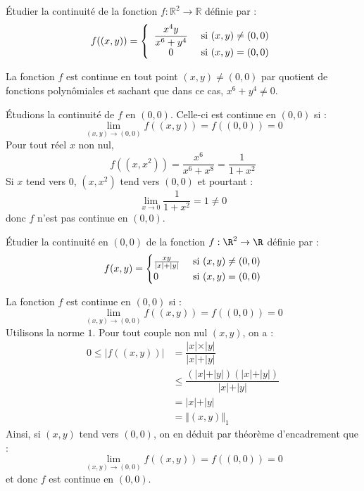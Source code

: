 \documentclass[a4paper,10pt]{report}
\begin{document}
\begin{Exercice}{} Étudier la continuité de la fonction $f : \mathbb{R}^2 \rightarrow \mathbb{R}$ définie par :
$$ f((x,y)) = \left\lbrace \begin{array}{cl}
\dfrac{x^4 y}{x^6+y^4} & \hbox{ si } (x,y) \neq (0,0) \\
0 & \hbox{ si } (x,y)=(0,0) \\
\end{array}\right.$$
\end{Exercice}

\corr La fonction $f$ est continue en tout point $(x,y) \neq (0,0)$ par quotient de fonctions polynômiales et sachant que dans ce cas, $x^6+y^4 \neq 0$. 

\medskip

\noindent Étudions la continuité de $f$ en $(0,0)$. Celle-ci est continue en $(0,0)$ si :
$$ \lim_{(x,y) \rightarrow (0,0)} f((x,y)) =f((0,0))= 0$$
Pour tout réel $x$ non nul,
$$ f((x,x^2)) = \dfrac{x^6}{x^6+x^8} = \dfrac{1}{1+x^2}$$
Si $x$ tend vers $0$, $(x,x^2)$ tend vers $(0,0)$ et pourtant :
$$ \lim_{x \rightarrow 0} \dfrac{1}{1+x^2} = 1 \neq 0$$
donc $f$ n'est pas continue en $(0,0)$.

\begin{Exercice}{} Étudier la continuité en $(0,0)$ de la fonction $f : \R^{2} \rightarrow \R$ définie par :
  \[
  f(x,y) =
  \begin{cases}
    \frac{xy}{\vert x \vert + \vert y \vert} & \hbox{ si } (x,y) \neq (0,0) \\
    0 & \hbox{ si } (x,y)=(0,0)
  \end{cases}
  \]
\end{Exercice}

\corr La fonction $f$ est continue en $(0,0)$ si :
$$ \lim_{(x,y) \rightarrow (0,0)} f((x,y)) =f((0,0))= 0$$
Utilisons la norme $1$. Pour tout couple non nul $(x,y)$, on a :
\begin{align*}
0 \leq \vert f((x,y)) \vert & = \dfrac{\vert x \vert \times \vert y \vert}{\vert x \vert + \vert y \vert} \\
& \leq \dfrac{(\vert x \vert + \vert y \vert)(\vert x \vert + \vert y \vert)}{\vert x \vert + \vert y \vert} \\
& = \vert x \vert + \vert y \vert \\
& = \Vert (x,y) \Vert_1
\end{align*}
Ainsi, si $(x,y)$ tend vers $(0,0)$, on en déduit par théorème d'encadrement que :
$$  \lim_{(x,y) \rightarrow (0,0)} f((x,y)) =f((0,0))= 0$$
et donc $f$ est continue en $(0,0)$.
\end{document}
